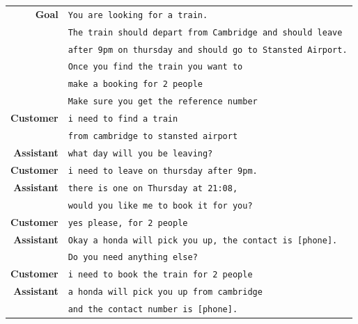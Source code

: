\begin{table}[tp]
    \centering
    \begin{tabular}{r|l}
    \toprule
         \textbf{Goal} & \texttt{You are looking for a train.}\\
         & \texttt{The train should depart from {\color{cyan!80!yellow!80!black!100 }Cambridge} and should leave} \\
         & \texttt{{\color{cyan!80!yellow!80!black!100 }after 9pm} on {\color{cyan!80!yellow!80!black!100 }thursday} and should go to {\color{cyan!80!yellow!80!black!100 }Stansted Airport}.} \\
         & \texttt{Once you find the train you want to} \\
         & \texttt{make a {\color{orange!50!yellow!90!black!100!}booking for 2 people}}\\
         & \texttt{Make sure you get the {\color{orange!50!yellow!90!black!100!}reference number}} \\
         \midrule
         \textbf{Customer} & \texttt{i need to find a train} \\
         & \texttt{from {\color{cyan!80!yellow!80!black!100 }cambridge} to {\color{cyan!80!yellow!80!black!100 }stansted airport}} \\
         \textbf{Assistant} & \texttt{what day will you be leaving?}\\
         \textbf{Customer} & \texttt{i need to leave on {\color{cyan!80!yellow!80!black!100 }thursday} {\color{cyan!80!yellow!80!black!100 }after 9pm.}}\\
         \textbf{Assistant} & \texttt{there is one on Thursday at {\color{orange!50!yellow!90!black!100!}21:08},}\\
         & \texttt{would you like me to book it for you?}\\
         \textbf{Customer} & \texttt{yes please, for 2 people} \\
         \textbf{Assistant} & \texttt{{\color{red!100!yellow!90!black!100!}Okay a honda will pick you up, the contact is [phone].}} \\
         & \texttt{Do you need anything else?} \\
         \textbf{Customer} & \texttt{i need to book the train for 2 people} \\
         \textbf{Assistant} & \texttt{{\color{red!100!yellow!90!black!100!}a honda will pick you up from cambridge }}\\
         & \texttt{{\color{red!100!yellow!90!black!100!}and the contact number is [phone].}}\\

\end{tabular}
\end{table}
